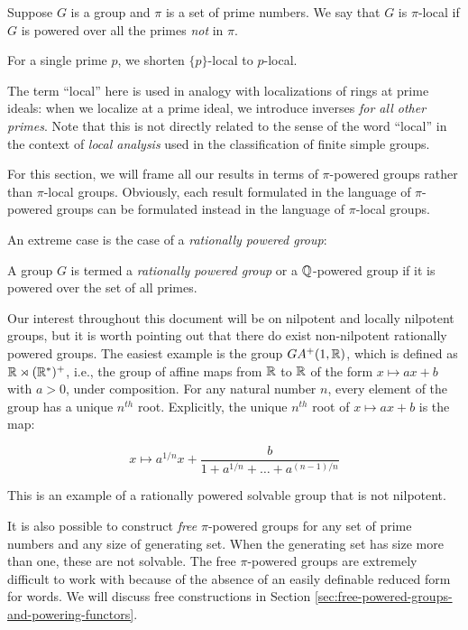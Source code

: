 \begin{definer}\label{def:localgroup}
  Suppose $G$ is a group and $\pi$ is a set of prime numbers. We say
  that $G$ is $\pi$-local if $G$ is powered over all the primes {\em
    not} in $\pi$.
\end{definer}

For a single prime $p$, we shorten $\{ p \}$-local to $p$-local.

The term ``local'' here is used in analogy with localizations of rings
at prime ideals: when we localize at a prime ideal, we introduce
inverses {\em for all other primes}. Note that this is not directly
related to the sense of the word ``local'' in the context of {\em
  local analysis} used in the classification of finite simple groups.

For this section, we will frame all our results in terms of
$\pi$-powered groups rather than $\pi$-local groups. Obviously, each
result formulated in the language of $\pi$-powered groups can be
formulated instead in the language of $\pi$-local groups.

An extreme case is the case of a {\em rationally powered group}:

\begin{definer}
  A group $G$ is termed a {\em rationally powered group} or a
  $\mathbb{Q}$-powered group if it is powered over the set of all primes.
\end{definer}

Our interest throughout this document will be on nilpotent and locally
nilpotent groups, but it is worth pointing out that there do exist
non-nilpotent rationally powered groups. The easiest example is the
group $GA^+(1,\mathbb{R})$, which is defined as $\mathbb{R} \rtimes (\mathbb{R}^*)^+$, i.e.,
the group of affine maps from $\mathbb{R}$ to $\mathbb{R}$ of the form $x \mapsto ax +
b$ with $a > 0$, under composition. For any natural number $n$, every
element of the group has a unique $n^{th}$ root. Explicitly, the
unique $n^{th}$ root of $x \mapsto ax + b$ is the map:

$$x \mapsto a^{1/n}x + \frac{b}{1 + a^{1/n} + \dots + a^{(n-1)/n}}$$

This is an example of a rationally powered solvable group that is not
nilpotent.

It is also possible to construct {\em free} $\pi$-powered groups for
any set of prime numbers and any size of generating set. When the
generating set has size more than one, these are not solvable. The
free $\pi$-powered groups are extremely difficult to work with because
of the absence of an easily definable reduced form for words. We will
discuss free constructions in Section
\ref{sec:free-powered-groups-and-powering-functors}.

